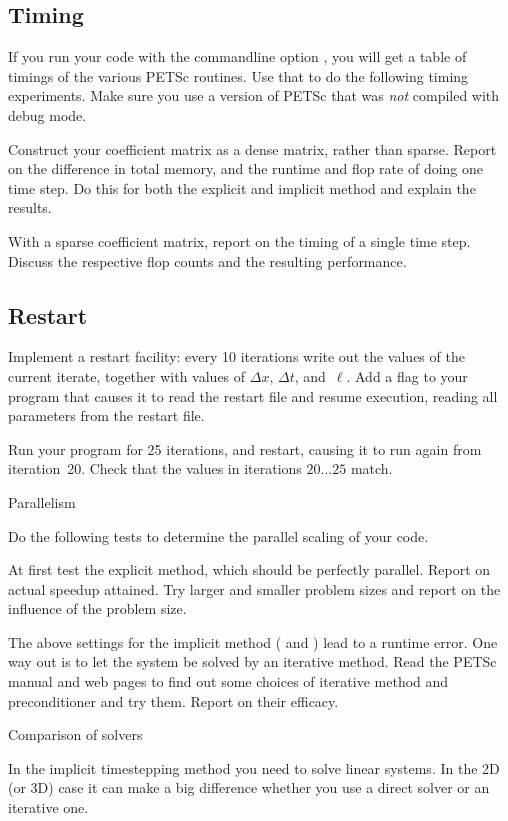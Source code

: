 \subsection*{Timing}

If you run your code with the commandline option , you
will get a table of timings of the various PETSc routines. Use that to do
the following timing experiments. Make sure you use a version of PETSc
that was \emph{not} compiled with debug mode.

Construct your coefficient matrix as a dense matrix, rather than
sparse. Report on the difference in total memory, and the runtime and
flop rate of doing one time step. Do this for both the explicit and
implicit method and explain the results.

With a sparse coefficient matrix, report on the timing of a
  single time step. Discuss the respective flop counts and the
  resulting performance.


\subsection*{Restart}

Implement a restart facility: every 10 iterations write out the
values of the current iterate, together with values of $\Delta x$,
$\Delta t$, and~$\ell$. Add a flag  to your program that
causes it to read the restart file and resume execution, reading all
parameters from the restart file.

Run your program for 25 iterations, and restart, causing it to run
again from iteration~20. Check that the values in iterations
$20\ldots25$ match.

 {Parallelism}

Do the following tests to determine the parallel scaling of your code.

At first test the explicit method, which should be perfectly
  parallel. Report on actual speedup attained. Try larger and smaller
  problem sizes and report on the influence of the problem size.

The above settings for the implicit method ( and
) lead to a runtime error. One way out is to let the system be
solved by an iterative method. Read the PETSc manual and web pages to
find out some choices of iterative method and preconditioner and try
them. Report on their efficacy.

 {Comparison of solvers}

In the implicit timestepping method you need to solve linear
systems. In the 2D (or 3D) case it can make a big difference whether
you use a direct solver or an iterative one.

